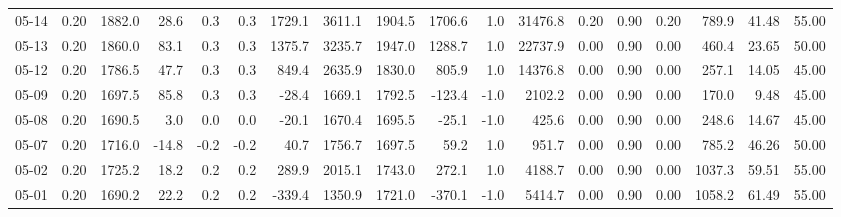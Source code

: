 \begin{threeparttable}
{\begin{tabular}{lrrrrrrrrrrrrrrrrr}
  05-14 &     0.20 & 1882.0 &              28.6 &               0.3 &                0.3 &             1729.1 & 3611.1 & 1904.5 &     1706.6 &                      1.0 &             31476.8 &       0.20 &      0.90 &           0.20 &            789.9 &           41.48 &                  55.00 \\
  05-13 &     0.20 & 1860.0 &              83.1 &               0.3 &                0.3 &             1375.7 & 3235.7 & 1947.0 &     1288.7 &                      1.0 &             22737.9 &       0.00 &      0.90 &           0.00 &            460.4 &           23.65 &                  50.00 \\
  05-12 &     0.20 & 1786.5 &              47.7 &               0.3 &                0.3 &              849.4 & 2635.9 & 1830.0 &      805.9 &                      1.0 &             14376.8 &       0.00 &      0.90 &           0.00 &            257.1 &           14.05 &                  45.00 \\
  05-09 &     0.20 & 1697.5 &              85.8 &               0.3 &                0.3 &              -28.4 & 1669.1 & 1792.5 &     -123.4 &                     -1.0 &              2102.2 &       0.00 &      0.90 &           0.00 &            170.0 &            9.48 &                  45.00 \\
  05-08 &     0.20 & 1690.5 &               3.0 &               0.0 &                0.0 &              -20.1 & 1670.4 & 1695.5 &      -25.1 &                     -1.0 &               425.6 &       0.00 &      0.90 &           0.00 &            248.6 &           14.67 &                  45.00 \\
  05-07 &     0.20 & 1716.0 &             -14.8 &              -0.2 &               -0.2 &               40.7 & 1756.7 & 1697.5 &       59.2 &                      1.0 &               951.7 &       0.00 &      0.90 &           0.00 &            785.2 &           46.26 &                  50.00 \\
  05-02 &     0.20 & 1725.2 &              18.2 &               0.2 &                0.2 &              289.9 & 2015.1 & 1743.0 &      272.1 &                      1.0 &              4188.7 &       0.00 &      0.90 &           0.00 &           1037.3 &           59.51 &                  55.00 \\
  05-01 &     0.20 & 1690.2 &              22.2 &               0.2 &                0.2 &             -339.4 & 1350.9 & 1721.0 &     -370.1 &                     -1.0 &              5414.7 &       0.00 &      0.90 &           0.00 &           1058.2 &           61.49 &                  55.00 \\

\end{tabular}}
\end{threeparttable}
